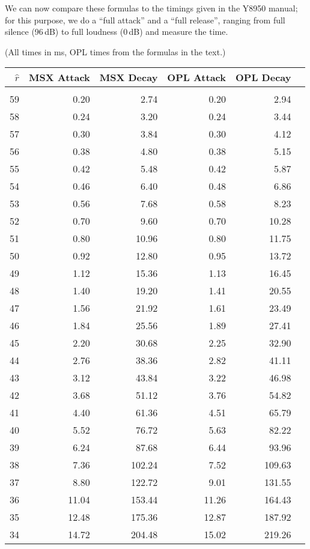 \documentclass[english]{scrartcl}
\begin{document}
We can now compare these formulas to the timings given in the Y8950 manual; for this purpose, we do a ``full attack'' and a ``full release'', ranging from full silence (96\,dB) to full loudness (0\,dB) and measure the time.

\begin{center}
\scriptsize
(All times in ms, OPL times from the formulas in the text.)

\begin{tabular}{rrrrrr}
$\hat r$ & MSX Attack & MSX Decay & OPL Attack & OPL Decay \\
\hline\\[-0.8em]
%
59 & 0.20 & 2.74 & 0.20 & 2.94 \\
58 & 0.24 & 3.20 & 0.24 & 3.44 \\
57 & 0.30 & 3.84 & 0.30 & 4.12 \\
56 & 0.38 & 4.80 & 0.38 & 5.15 \\
55 & 0.42 & 5.48 & 0.42 & 5.87 \\
54 & 0.46 & 6.40 & 0.48 & 6.86 \\
53 & 0.56 & 7.68 & 0.58 & 8.23 \\
52 & 0.70 & 9.60 & 0.70 & 10.28 \\
51 & 0.80 & 10.96 & 0.80 & 11.75 \\
50 & 0.92 & 12.80 & 0.95 & 13.72 \\
49 & 1.12 & 15.36 & 1.13 & 16.45 \\
48 & 1.40 & 19.20 & 1.41 & 20.55 \\
47 & 1.56 & 21.92 & 1.61 & 23.49 \\
46 & 1.84 & 25.56 & 1.89 & 27.41 \\
45 & 2.20 & 30.68 & 2.25 & 32.90 \\
44 & 2.76 & 38.36 & 2.82 & 41.11 \\
43 & 3.12 & 43.84 & 3.22 & 46.98 \\
42 & 3.68 & 51.12 & 3.76 & 54.82 \\
41 & 4.40 & 61.36 & 4.51 & 65.79 \\
40 & 5.52 & 76.72 & 5.63 & 82.22 \\
39 & 6.24 & 87.68 & 6.44 & 93.96 \\
38 & 7.36 & 102.24 & 7.52 & 109.63 \\
37 & 8.80 & 122.72 & 9.01 & 131.55 \\
36 & 11.04 & 153.44 & 11.26 & 164.43 \\
35 & 12.48 & 175.36 & 12.87 & 187.92 \\
34 & 14.72 & 204.48 & 15.02 & 219.26 \\

\end{tabular}
\end{center}
\end{document}

